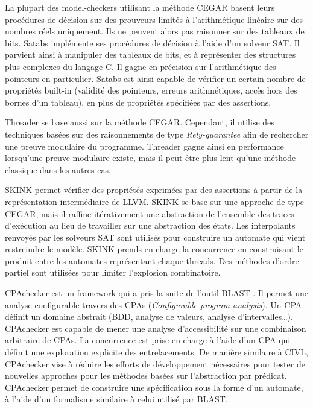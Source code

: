 La plupart des model-checkers utilisant la méthode \ac{CEGAR} basent leurs procédures
de décision sur des prouveurs limités à l'arithmétique linéaire sur des nombres
réels uniquement. Ils ne peuvent alors pas raisonner sur des tableaux de bits.
Satabs\cite{Satabs}\cite{clarkesatabs} implémente ses procédures de décision à
l'aide d'un solveur SAT. Il parvient ainsi à manipuler des tableaux de bits, et
à représenter des structures plus complexes du langage C. Il gagne en précision
sur l'arithmétique des pointeurs en particulier. Satabs est ainsi capable de
vérifier un certain nombre de propriétés built-in (validité des pointeurs,
erreurs arithmétiques, accès hors des bornes d'un tableau), en plus de
propriétés spécifiées par des assertions.

Threader\cite{Threader}\cite{Threader_theory} se base aussi sur la méthode
\ac{CEGAR}. Cependant, il utilise des techniques basées sur des raisonnements de type
\emph{Rely-guarantee} afin de rechercher une preuve modulaire du programme.
Threader gagne ainsi en performance lorsqu'une preuve modulaire existe, mais
il peut être plus lent qu'une méthode classique dans les autres cas.

SKINK\cite{SKINK} permet vérifier des propriétés exprimées par des assertions à
partir de la représentation intermédiaire de LLVM. SKINK se base sur une
approche de type CEGAR, mais il raffine itérativement une abstraction de
l'ensemble des traces d'exécution au lieu de travailler sur une abstraction des
états. Les interpolants renvoyés par les solveurs SAT sont utilisés pour
construire un automate qui vient restreindre le modèle. SKINK prends en charge
la concurrence en construisant le produit entre les automates représentant
chaque threads. Des méthodes d'ordre partiel sont utilisées pour limiter
l'explosion combinatoire.

CPAchecker\cite{CPAChecker} est un framework qui a pris la suite de l'outil
BLAST \cite{BLAST}. Il permet une analyse configurable travers des CPAs
(\emph{Configurable program analysis}). Un CPA définit un domaine abstrait
(BDD, analyse de valeurs, analyse d'intervalles\dots). CPAchecker est capable
de mener une analyse d'accessibilité sur une combinaison arbitraire de CPAs. La
concurrence est prise en charge à l'aide d'un CPA qui définit une exploration
explicite des entrelacements\cite{CPAChecker_multithread}. De manière similaire
à CIVL, CPAchecker vise à réduire les efforts de développement nécessaires pour
tester de nouvelles approches pour les méthodes basées sur l'abstraction par
prédicat. CPAchecker permet de construire une spécification sous la forme d'un
automate, à l'aide d'un formalisme similaire à celui utilisé par BLAST.

